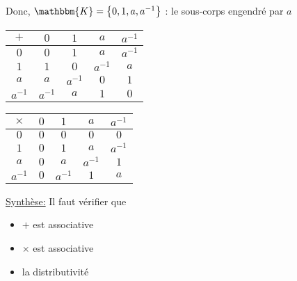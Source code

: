 Donc, $\mathbbm{K} = \left\{ 0,1,a,a^{-1} \right\}$ : le sous-corps engendré par $a$

\begin{center}
	\begin{tabular}
		{|c|c|c|c|c|}
		\hline
		$+$&$0$&$1$&$a$&$a^{-1}$\\ \hline
		$0$&$0$&$1$&$a$&$a^{-1}$\\ \hline
		$1$&$1$&$0$&$a^{-1}$&$a$\\ \hline
		$a$&$a$&$a^{-1}$&$0$&$1$\\ \hline
		$a^{-1}$&$a^{-1}$&$a$&$1$&$0$\\ \hline
	\end{tabular}
\end{center}


\begin{center}
	\begin{tabular}{|c|c|c|c|c|}
		\hline
		$\times$& $0$ & $1$& $a$ & $a^{-1}$ \\ \hline
		$0$ &$0$ &$0$ &$0$&$0$ \\ \hline
		$1$ &$0$ &$1$ &$a$ &$a^{-1}$ \\ \hline
		$a$ &$0$ &$a$ &$a^{-1}$ &$1$\\ \hline
		$a^{-1}$ &$0$ &$a^{-1}$ &$1$ &$a$ \\ \hline
	\end{tabular}
\end{center}

\underline{\large Synthèse:}
Il faut vérifier que
\begin{itemize}
	\item $+$ est associative
	\item $\times$ est associative
	\item la distributivité
\end{itemize}
